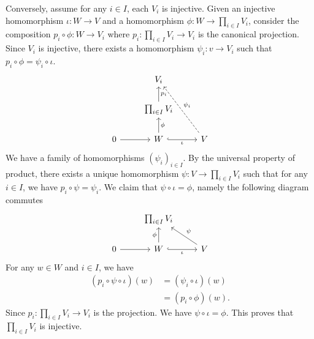 \documentclass[a4paper, 12pt]{article}
\begin{document}
\begin{solution}
\begin{enumerate}[(1)]
Conversely, assume for any \(i\in I\), each \(V_i\) is injective. Given an injective homomorphism \(\iota:W\rightarrow V\) and a homomorphism \(\phi:W\rightarrow \prod_{i\in I}V_i\), consider the composition 
\(p_i\circ \phi:W\rightarrow V_i\) where \(p_i:\prod_{i\in I}V_i\rightarrow V_i\) is the canonical projection. Since \(V_i\) is injective, there exists a homomorphism \(\psi_i:v\rightarrow V_i\) such that \(p_i\circ \phi=\psi_i\circ \iota\). 
\[\begin{tikzcd}
	& {V_i} \\
	& {\prod_{i\in I}V_i} \\
	0 & W & V
	\arrow["{p_i}"', from=2-2, to=1-2]
	\arrow[from=3-1, to=3-2]
	\arrow["\phi"', from=3-2, to=2-2]
	\arrow["\iota"', hook, from=3-2, to=3-3]
	\arrow["{\psi_i}"', dashed, from=3-3, to=1-2]
\end{tikzcd}\]
We have a family of homomorphisms \((\psi_i)_{i\in I}\). By the universal property of product, there exists a unique homomorphism \(\psi:V\rightarrow \prod_{i\in I}V_i\) such that for any \(i\in I\), we have \(p_i\circ \psi=\psi_i\). We claim that \(\psi\circ \iota=\phi\), namely 
the following diagram commutes
\[\begin{tikzcd}
	& {\prod_{i\in I}V_i} \\
	0 & W & V
	\arrow[from=2-1, to=2-2]
	\arrow["\phi", from=2-2, to=1-2]
	\arrow["\iota"', hook, from=2-2, to=2-3]
	\arrow["\psi"', from=2-3, to=1-2]
\end{tikzcd}\]
For any \(w\in W\) and \(i\in I\), we have 
\begin{align*}
    (p_i\circ\psi\circ \iota)(w)&=(\psi_i\circ \iota)(w)\\ 
                                &=(p_i\circ \phi)(w).
\end{align*}
Since \(p_i:\prod_{i\in I}V_i\rightarrow V_i\) is the projection. We have \(\psi\circ \iota=\phi\). This proves that \(\prod_{i\in I}V_i\) is injective.
\end{enumerate}
\end{solution}
\end{document}
